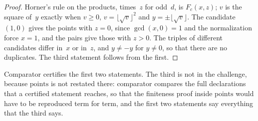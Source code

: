 \begin{proof}
  \leanok
  Horner's rule on the products, times~$z$ for odd~$d$, is $F_c(x, z)$; $v$ is the square of~$y$
  exactly when $v \ge 0$, $v = \lfloor \sqrt{v} \rfloor^2$ and $y = \pm \lfloor \sqrt{v} \rfloor$.
  The candidate $(1, 0)$ gives the points with $z = 0$, since $\gcd(x, 0) = 1$ and the
  normalization force $x = 1$, and the pairs give those with $z > 0$. The triples of different
  candidates differ in~$x$ or in~$z$, and $y \ne -y$ for $y \ne 0$, so that there are no duplicates.
  The third statement follows from the first.
\end{proof}

Comparator certifies the first two statements. The third is not in the challenge, because
$\mathrm{points}$ is not restated there: comparator compares the full declarations that a certified
statement reaches, so that the finiteness proof inside $\mathrm{points}$ would have to be reproduced
term for term, and the first two statements say everything that the third says.
